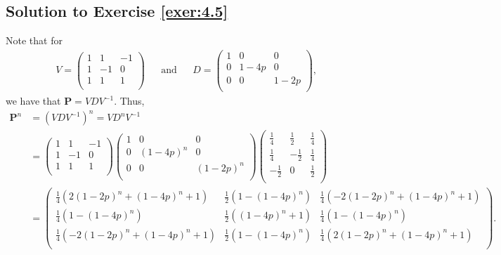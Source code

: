 \documentclass[12pt]{book}
\numberwithin{equation}{chapter}
\theoremstyle{plain}
\numberwithin{theorem}{section}
\theoremstyle{definition}
\numberwithin{exercise}{chapter}
\newcommand{\<}{\langle}
\renewcommand{\>}{\rangle}
\renewcommand{\(}{\left(}
\renewcommand{\)}{\right)}
\renewcommand{\[}{\left[}
\renewcommand{\]}{\right]}
\newcommand\Pv{\pmb{P}}
\begin{document}
\subsection*{Solution to Exercise \ref{exer:4.5}}
Note that for 
\begin{align}
&V 
	= \left(
\begin{array}{ccc}
 1 & 1 & -1 \\
 1 & -1 & 0 \\
 1 & 1 & 1 \\
\end{array}
\right)
&&\text{and}
&& D 
	= 
\left(
\begin{array}{ccc}
 1 & 0 & 0 \\
 0 & 1-4 p & 0 \\
 0 & 0 & 1-2 p \\
\end{array}
\right),
\end{align}
we have that $\Pv = V D V^{-1}$. Thus, 
\begin{align}
\Pv^n
	&= (V D V^{-1})^n
	= V D^n V^{-1} \\
	&= 
\left(
\begin{array}{ccc}
 1 & 1 & -1 \\
 1 & -1 & 0 \\
 1 & 1 & 1 \\
\end{array}
\right)
\left(
\begin{array}{ccc}
 1 & 0 & 0 \\
 0 & (1-4 p)^n & 0 \\
 0 & 0 & (1-2 p)^n \\
\end{array}
\right)
\left(
\begin{array}{ccc}
 \frac{1}{4} & \frac{1}{2} & \frac{1}{4} \\
 \frac{1}{4} & -\frac{1}{2} & \frac{1}{4} \\
 -\frac{1}{2} & 0 & \frac{1}{2} \\
\end{array}
\right) \\
	&=
\left(
\begin{array}{ccc}
 \frac{1}{4} \left(2 (1-2 p)^n+(1-4 p)^n+1\right) & \frac{1}{2} \left(1-(1-4 p)^n\right) & \frac{1}{4} \left(-2 (1-2 
p)^n+(1-4 p)^n+1\right) \\
 \frac{1}{4} \left(1-(1-4 p)^n\right) & \frac{1}{2} \left((1-4 p)^n+1\right) & \frac{1}{4} \left(1-(1-4 p)^n\right) \\
 \frac{1}{4} \left(-2 (1-2 p)^n+(1-4 p)^n+1\right) & \frac{1}{2} \left(1-(1-4 p)^n\right) & \frac{1}{4} \left(2 (1-2 
p)^n+(1-4 p)^n+1\right) \\
\end{array}
\right) .
\end{align}
\end{document}
